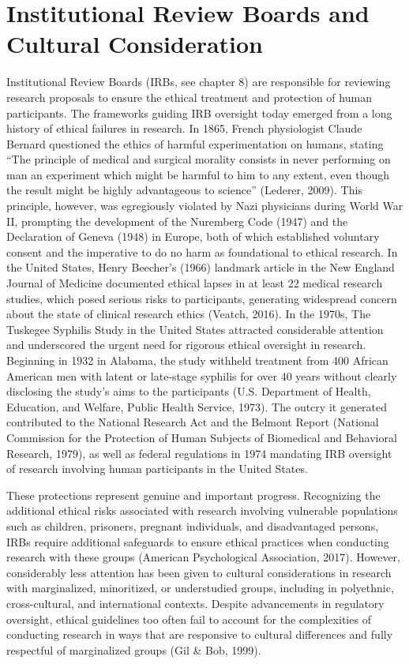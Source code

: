 \documentclass[
  11pt,
]{book}
\begin{document}
\section{Institutional Review Boards and Cultural Consideration}\label{institutional-review-boards-and-cultural-consideration}

Institutional Review Boards (IRBs, see chapter 8) are responsible for reviewing research proposals to ensure the ethical treatment and protection of human participants. The frameworks guiding IRB oversight today emerged from a long history of ethical failures in research. In 1865, French physiologist Claude Bernard questioned the ethics of harmful experimentation on humans, stating ``The principle of medical and surgical morality consists in never performing on man an experiment which might be harmful to him to any extent, even though the result might be highly advantageous to science'' (Lederer, 2009). This principle, however, was egregiously violated by Nazi physicians during World War II, prompting the development of the Nuremberg Code (1947) and the Declaration of Geneva (1948) in Europe, both of which established voluntary consent and the imperative to do no harm as foundational to ethical research. In the United States, Henry Beecher's (1966) landmark article in the New England Journal of Medicine documented ethical lapses in at least 22 medical research studies, which posed serious risks to participants, generating widespread concern about the state of clinical research ethics (Veatch, 2016). In the 1970s, The Tuskegee Syphilis Study in the United States attracted considerable attention and underscored the urgent need for rigorous ethical oversight in research. Beginning in 1932 in Alabama, the study withheld treatment from 400 African American men with latent or late-stage syphilis for over 40 years without clearly disclosing the study's aims to the participants (U.S. Department of Health, Education, and Welfare, Public Health Service, 1973). The outcry it generated contributed to the National Research Act and the Belmont Report (National Commission for the Protection of Human Subjects of Biomedical and Behavioral Research, 1979), as well as federal regulations in 1974 mandating IRB oversight of research involving human participants in the United States.

These protections represent genuine and important progress. Recognizing the additional ethical risks associated with research involving vulnerable populations such as children, prisoners, pregnant individuals, and disadvantaged persons, IRBs require additional safeguards to ensure ethical practices when conducting research with these groups (American Psychological Association, 2017). However, considerably less attention has been given to cultural considerations in research with marginalized, minoritized, or understudied groups, including in polyethnic, cross-cultural, and international contexts. Despite advancements in regulatory oversight, ethical guidelines too often fail to account for the complexities of conducting research in ways that are responsive to cultural differences and fully respectful of marginalized groups (Gil \& Bob, 1999).
\end{document}
